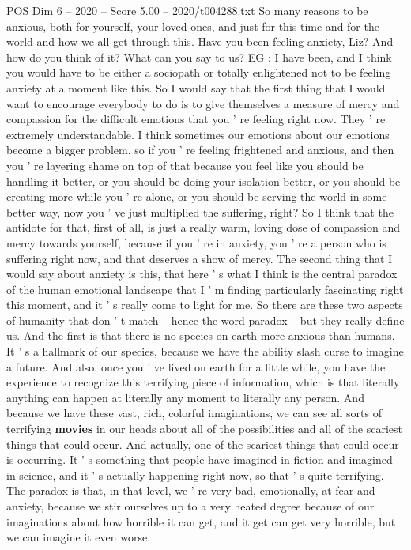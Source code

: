 \begin{textsample}{POS Dim 6 – 2020 – Score 5.00 – 2020/t004288.txt}
So many reasons to be anxious, both for yourself, your loved ones, and just for this time and for the world and how we all get through this.
Have you been feeling anxiety, Liz?
And how do you think of it?
What can you say to us?
EG : I have been, and I think you would have to be either a sociopath or totally enlightened not to be feeling anxiety at a moment like this.
So I would say that the first thing that I would want to encourage everybody to do is to give themselves a measure of mercy and compassion for the difficult emotions that you ' re feeling right now.
They ' re extremely understandable.
I think sometimes our emotions about our emotions become a bigger problem, so if you ' re feeling frightened and anxious, and then you ' re layering shame on top of that because you feel like you should be handling it better, or you should be doing your isolation better, or you should be creating more while you ' re alone, or you should be serving the world in some better way, now you ' ve just multiplied the suffering, right?
So I think that the antidote for that, first of all, is just a really warm, loving dose of compassion and mercy towards yourself, because if you ' re in anxiety, you ' re a person who is suffering right now, and that deserves a show of mercy.
The second thing that I would say about anxiety is this, that here ' s what I think is the central paradox of the human emotional landscape that I ' m finding particularly fascinating right this moment, and it ' s really come to light for me.
So there are these two aspects of humanity that don ' t match -- hence the word paradox -- but they really define us.
And the first is that there is no species on earth more anxious than humans.
It ' s a hallmark of our species, because we have the ability slash curse to imagine a future.
And also, once you ' ve lived on earth for a little while, you have the experience to recognize this terrifying piece of information, which is that literally anything can happen at literally any moment to literally any person.
And because we have these vast, rich, colorful imaginations, we can see all sorts of terrifying \textbf{movies} in our heads about all of the possibilities and all of the scariest things that could occur.
And actually, one of the scariest things that could occur is occurring.
It ' s something that people have imagined in fiction and imagined in science, and it ' s actually happening right now, so that ' s quite terrifying.
The paradox is that, in that level, we ' re very bad, emotionally, at fear and anxiety, because we stir ourselves up to a very heated degree because of our imaginations about how horrible it can get, and it get can get very horrible, but we can imagine it even worse.

\end{textsample}
